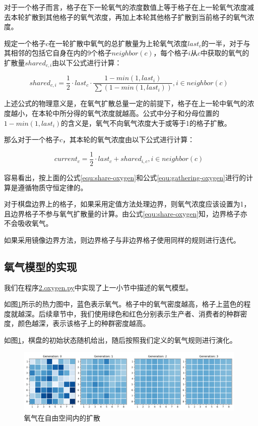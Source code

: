\documentclass{ctexart}
\begin{document}
对于一个格子而言，格子在下一轮氧气的浓度数值上等于格子在上一轮氧气浓度减去本轮扩散到其他格子的氧气浓度，再加上本轮其他格子扩散到当前格子的氧气浓度。

规定一个格子$c$在一轮扩散中氧气的总扩散量为上轮氧气浓度$last_c$的一半，对于与其相邻的包括它自身在内的9个格子$neighbor(c)$，每个格子$i$从$c$中获取的氧气的扩散量$shared_{c, i}$由以下公式进行计算：

\begin{equation}
  \label{equ:share-oxygen}
  shared_{c, i} = \frac{1}{2} \cdot last_c \cdot \frac{1 - min(1, last_i)}{\sum (1 - min(1, last_i))}, i \in neighbor(c)
\end{equation}

上述公式的物理意义是，在氧气扩散总量一定的前提下，格子在上一轮中氧气的浓度越小，在本轮中所分得的氧气浓度就越高。公式中分子和分母位置的$1 - min(1, last_i)$的含义是，氧气不向氧气浓度大于或等于1的格子扩散。

那么对于一个格子$c$，其本轮的氧气浓度由以下公式进行计算：

\begin{equation}
  \label{equ:gathering-oxygen}
  current_c = \frac{1}{2} \cdot last_c + shared_{i, c} , i \in neighbor(c)
\end{equation}

容易看出，按上面的公式\ref{equ:share-oxygen}和公式\ref{equ:gathering-oxygen}进行的计算是遵循物质守恒定律的。

对于棋盘边界上的格子，如果采用定值方法处理边界，则氧气浓度应该设置为1，且边界格子不参与氧气扩散量的计算。由公式\ref{equ:share-oxygen}知，边界格子亦不会吸收氧气。

如果采用镜像边界方法，则边界格子与非边界格子使用同样的规则进行迭代。

\subsection{氧气模型的实现}

我们在程序\underline{2.oxygen.py}中实现了上一小节中描述的氧气模型。

如图\ref{fig:oxygen-flow}所示的热力图中，蓝色表示氧气。格子中的氧气密度越高，格子上蓝色的程度就越深。后续章节中，我们使用绿色和红色分别表示生产者、消费者的种群密度，颜色越深，表示该格子上的种群密度越高。

如图\ref{fig:oxygen-flow}，棋盘的初始状态随机给出，随后按照我们定义的氧气规则进行演化。

\begin{figure}[ht]
  \centering
  \includegraphics[width=\textwidth]{oxygen-flow.png}
  \caption{氧气在自由空间内的扩散}
  \label{fig:oxygen-flow}
\end{figure}
\end{document}
